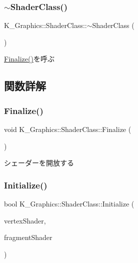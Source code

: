 \subsubsection{\texorpdfstring{$\sim$\+Shader\+Class()}{~ShaderClass()}}
{\footnotesize\ttfamily K\+\_\+\+Graphics\+::\+Shader\+Class\+::$\sim$\+Shader\+Class (\begin{DoxyParamCaption}{ }\end{DoxyParamCaption})}



\mbox{\hyperlink{class_k___graphics_1_1_shader_class_aac58eae7621bb220380364400f659549}{Finalize()}}を呼ぶ 



\subsection{関数詳解}
\mbox{\label{class_k___graphics_1_1_shader_class_aac58eae7621bb220380364400f659549}} 
\subsubsection{\texorpdfstring{Finalize()}{Finalize()}}
{\footnotesize\ttfamily void K\+\_\+\+Graphics\+::\+Shader\+Class\+::\+Finalize (\begin{DoxyParamCaption}{ }\end{DoxyParamCaption})}



シェーダーを開放する 

\mbox{\label{class_k___graphics_1_1_shader_class_ac37343a738ce216a5f1f3fb501de79ed}} 
\subsubsection{\texorpdfstring{Initialize()}{Initialize()}}
{\footnotesize\ttfamily bool K\+\_\+\+Graphics\+::\+Shader\+Class\+::\+Initialize (\begin{DoxyParamCaption}\item[{G\+Luint}]{vertex\+Shader,  }\item[{G\+Luint}]{fragment\+Shader }\end{DoxyParamCaption})}



